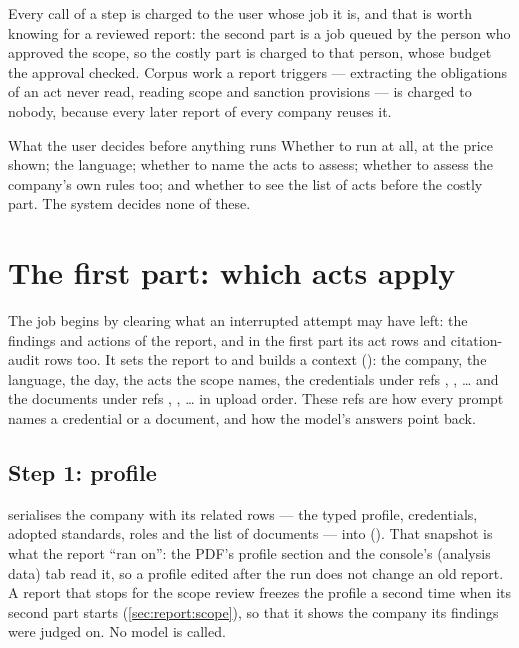 Every call of a step is charged to the user whose job it is, and that is worth knowing for a
reviewed report: the second part is a job queued by the person who approved the scope, so the
costly part is charged to that person, whose budget the approval checked. Corpus work a report
triggers --- extracting the obligations of an act never read, reading scope and sanction
provisions --- is charged to nobody, because every later report of every company reuses it.

\begin{humanbox}{What the user decides before anything runs}
Whether to run at all, at the price shown; the language; whether to name the acts to assess;
whether to assess the company's own rules too; and whether to see the list of acts before the
costly part. The system decides none of these.
\end{humanbox}


\section{The first part: which acts apply}\label{sec:report:first}

The job begins by clearing what an interrupted attempt may have left: the findings and actions
of the report, and in the first part its act rows and citation-audit rows too. It sets the
report to  and builds a context (): the company, the language, the
day, the acts the scope names, the credentials under refs , , \ldots{} and
the documents under refs , , \ldots{} in upload order. These refs are how
every prompt names a credential or a document, and how the model's answers point back.

\subsection{Step 1: profile}

 serialises the company with its related rows --- the typed profile,
credentials, adopted standards, roles and the list of documents --- into
 (). That snapshot is what the report \enquote{ran on}: the PDF's
profile section and the console's  (analysis data) tab read it, so a
profile edited after the run does not change an old report. A report that stops for the scope
review freezes the profile a second time when its second part starts
(\cref{sec:report:scope}), so that it shows the company its findings were judged on. No model
is called.

